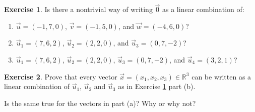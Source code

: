 \documentclass{beamer}
\newcommand{\R}{\mathbb{R}}
\newcommand{\fn}{\insertframenumber}
\theoremstyle{definition}
\newtheorem{exercise}{Exercise}
\begin{document}
\begin{frame}{\fn}
	\begin{exercise}\label{exercise:linearindependence}
		Is there a nontrivial way of writing $\vec 0$ as a linear combination of:
		\begin{enumerate}[label=(\alph*)]
			\item $\vec u=(-1,  7,  0)$, $\vec v=(-1,  5,  0)$, and $\vec w=(-4,  6,  0)$?
			\item $\vec u_1=(7,  6,  2)$, $\vec u_2=(2,  2,  0)$, and $\vec u_3=(0,  7,  -2)$?
			\item $\vec u_1=(7,  6,  2)$, $\vec u_2=(2,  2,  0)$, $\vec u_3=(0,  7,  -2)$, and $\vec u_4=(3,2,1)$?
		\end{enumerate}
	\end{exercise}
	\begin{exercise}
		Prove that every vector $\vec x=(x_1,x_2,x_3)\in\R^3$ can be written as a linear combination of $\vec u_1$, $\vec u_2$ and $\vec u_3$ as in Exercise \ref{exercise:linearindependence} part (b).
		
		Is the same true for the vectors in part (a)? Why or why not?
	\end{exercise}
\end{frame}
\end{document}
